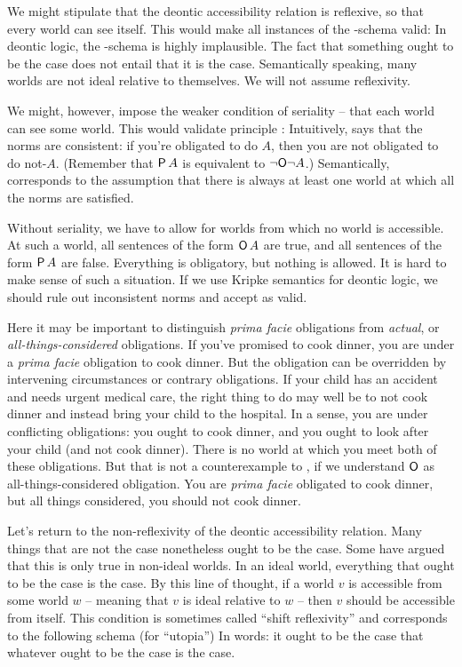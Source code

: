 We might stipulate that the deontic accessibility relation is reflexive, so that
every world can see itself. This would make all instances of the -schema
valid:
%
%
In deontic logic, the -schema is highly implausible. The fact that
something ought to be the case does not entail that it is the case. Semantically
speaking, many worlds are not ideal relative to themselves. We will not assume
reflexivity.

We might, however, impose the weaker condition of seriality -- that each world
can see some world. This would validate principle :
%
%
Intuitively,  says that the norms are consistent: if you're obligated to
do $A$, then you are not obligated to do not-$A$. (Remember that $\operatorname{\mathsf{P}} A$
is equivalent to $\neg\! \operatorname{\mathsf{O}}\! \neg A$.) Semantically,  corresponds to the
assumption that there is always at least one world at which all the norms are
satisfied.

Without seriality, we have to allow for worlds from which no world is
accessible. At such a world, all sentences of the form $\operatorname{\mathsf{O}} A$ are true, and all
sentences of the form $\operatorname{\mathsf{P}} A$ are false. Everything is obligatory, but nothing
is allowed. It is hard to make sense of such a situation. If we use Kripke
semantics for deontic logic, we should rule out inconsistent norms and accept
 as valid.

Here it may be important to distinguish \emph{prima facie} obligations from
\emph{actual}, or \emph{all-things-considered} obligations. If you've promised
to cook dinner, you are under a \emph{prima facie} obligation to cook dinner.
But the obligation can be overridden by intervening circumstances or contrary
obligations. If your child has an accident and needs urgent medical care, the
right thing to do may well be to not cook dinner and instead bring your child to
the hospital. In a sense, you are under conflicting obligations: you ought to
cook dinner, and you ought to look after your child (and not cook dinner). There
is no world at which you meet both of these obligations. But that is not a
counterexample to , if we understand $\operatorname{\mathsf{O}}$ as all-things-considered
obligation. You are \emph{prima facie} obligated to cook dinner, but all things
considered, you should not cook dinner.

Let's return to the non-reflexivity of the deontic accessibility relation. Many
things that are not the case nonetheless ought to be the case. Some have argued
that this is only true in non-ideal worlds. In an ideal world, everything that
ought to be the case is the case. By this line of thought, if a world $v$ is
accessible from some world $w$ -- meaning that $v$ is ideal relative to $w$ --
then $v$ should be accessible from itself. This condition is sometimes called
``shift reflexivity'' and corresponds to the following schema  (for
``utopia'')
%
%
In words: it ought to be the case that whatever ought to be the case is the
case.

